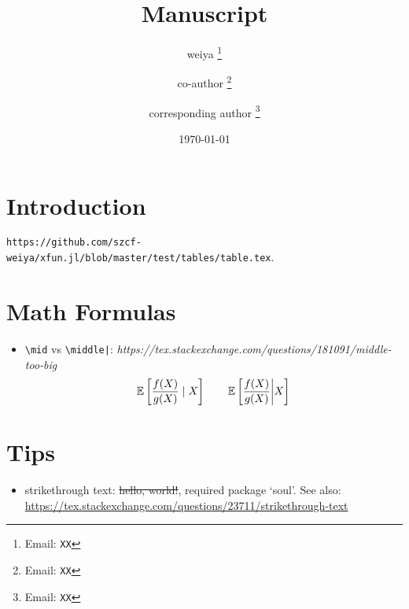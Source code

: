 \documentclass[12pt]{article}
\title{Manuscript}
\author[1]{weiya%
  \thanks{Email: \texttt{XX}}
}
\affil[1]{Department of Statistics, XX}
\author[1]{co-author%
  \thanks{Email: \texttt{XX}}
}
\author[2]{corresponding author%
\thanks{Email: \texttt{XX}}
}
\affil[2]{Department of Statistics, XX}
\date{\today}
\begin{document}
\maketitle
\pagestyle{fancy}
\lhead{}
\rhead{}

\maketitle

\section{Introduction}

\begin{table}[H]
    \centering
    \resizebox{1.0\textwidth}{!}{%
        
    }
    \caption{\texttt{https://github.com/szcf-weiya/xfun.jl/blob/master/test/tables/table.tex}.}
    \label{tab:test}
\end{table}

\section{Math Formulas}

\begin{itemize}
    \item \verb#\mid# vs \verb#\middle|#: \textit{https://tex.stackexchange.com/questions/181091/middle-too-big}
    $$
    {\mathbb E}\left[\frac{f(X)}{g(X)}\mid X\right] \qquad {\mathbb E}\left[\frac{f(X)}{g(X)}\middle| X\right]
    $$
\end{itemize}


\section{Tips}

\begin{itemize}
  \item strikethrough text: \st{hello, world!}, required package `soul'. See also: \url{https://tex.stackexchange.com/questions/23711/strikethrough-text}
\end{itemize}

\printbibliography
\end{document}
